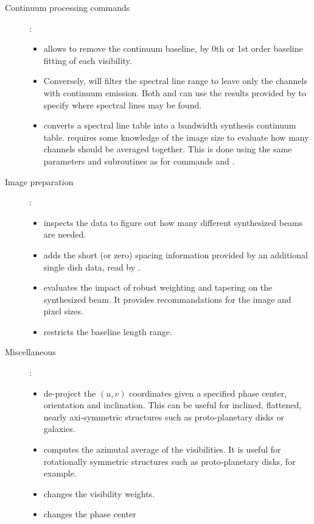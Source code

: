\begin{description}
\item[Continuum processing commands]:
\begin{itemize}\itemsep 0pt
\item {} allows to remove the continuum baseline, by
0th or 1st order baseline fitting of each visibility. 
\item Conversely,  will filter the spectral line
range to leave only the channels with continuum emission.
Both  and  can use the results provided
by  to specify where spectral lines may be found.
\item {} converts a spectral line \uv{} table into a bandwidth 
synthesis continuum \uv{} table.  requires some knowledge of 
the image size to evaluate how many channels should be averaged 
together. This is done using the same parameters and subroutines as 
for commands  and .
\end{itemize}

\item[Image preparation]:
\begin{itemize}\itemsep 0pt
\item {} inspects the \uv{} data to figure out how many
different synthesized beams are needed.
\item {} adds the short (or zero) spacing information provided by
an additional single dish data, read by .
\item {} evaluates the impact of robust weighting
and tapering on the synthesized beam. It provides recommandations for
the image and pixel sizes.
\item {} restricts the \uv{} baseline length range.
\end{itemize}

\item[Miscellaneous]:
\begin{itemize}\itemsep 0pt
\item {} de-project the $(u,v)$ coordinates given
a specified phase center, orientation and inclination. This can be
useful for inclined, flattened, nearly axi-symmetric structures such as
proto-planetary disks or galaxies. 
\item {} computes the azimutal average of the visibilities.
It is useful for rotationally symmetric structures such as proto-planetary disks, 
for example.
\item {} changes the visibility weights.
\item {} changes the phase center
\end{itemize}

\end{description} 

